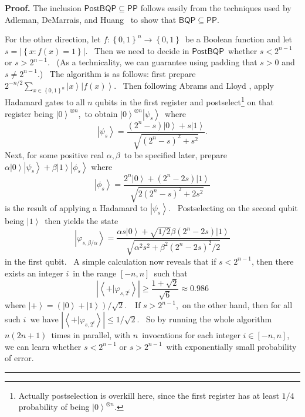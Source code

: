 \documentclass[12pt]{article}%
\newenvironment{proof}[1][Proof]{\noindent\textbf{#1.} }{\ \rule{0.5em}{0.5em}}
\begin{document}
\begin{proof}
The inclusion $\mathsf{PostBQP}\subseteq\mathsf{PP}$ follows easily from the
techniques used by Adleman, DeMarrais, and Huang \cite{adh}\ to show that
$\mathsf{BQP}\subseteq\mathsf{PP}$.

For the other direction, let $f:\left\{  0,1\right\}  ^{n}\rightarrow\left\{
0,1\right\}  $\ be a Boolean function and let $s=\left\vert \left\{
x:f\left(  x\right)  =1\right\}  \right\vert $. \ Then we need to decide in
$\mathsf{PostBQP}$\ whether $s<2^{n-1}$ or $s>2^{n-1}$. \ (As a technicality,
we can guarantee using padding that $s>0$ and $s\neq2^{n-1}$.) \ The algorithm
is as follows: first prepare $2^{-n/2}\sum_{x\in\left\{  0,1\right\}  ^{n}%
}\left\vert x\right\rangle \left\vert f\left(  x\right)  \right\rangle $.
\ Then following Abrams and Lloyd \cite{al}, apply Hadamard gates to all $n$
qubits in the first register and postselect\footnote{Actually postselection is
overkill here, since the first register has at least $1/4$ probability of
being $\left\vert 0\right\rangle ^{\otimes n}$.} on that register being
$\left\vert 0\right\rangle ^{\otimes n}$,\ to obtain $\left\vert
0\right\rangle ^{\otimes n}\left\vert \psi_{s}\right\rangle $\ where%
\[
\left\vert \psi_{s}\right\rangle =\frac{\left(  2^{n}-s\right)  \left\vert
0\right\rangle +s\left\vert 1\right\rangle }{\sqrt{\left(  2^{n}-s\right)
^{2}+s^{2}}}.
\]
Next, for some positive real $\alpha,\beta$\ to be specified later, prepare
$\alpha\left\vert 0\right\rangle \left\vert \psi_{s}\right\rangle
+\beta\left\vert 1\right\rangle \left\vert \phi_{s}\right\rangle $ where
\[
\left\vert \phi_{s}\right\rangle =\frac{2^{n}\left\vert 0\right\rangle
+\left(  2^{n}-2s\right)  \left\vert 1\right\rangle }{\sqrt{2\left(
2^{n}-s\right)  ^{2}+2s^{2}}}%
\]
is the result of applying a Hadamard to $\left\vert \psi_{s}\right\rangle $.
\ Postselecting on the second qubit being $\left\vert 1\right\rangle $\ then
yields the state%
\[
\left\vert \varphi_{s,\beta/\alpha}\right\rangle =\frac{\alpha s\left\vert
0\right\rangle +\sqrt{1/2}\beta\left(  2^{n}-2s\right)  \left\vert
1\right\rangle }{\sqrt{\alpha^{2}s^{2}+\beta^{2}\left(  2^{n}-2s\right)
^{2}/2}}%
\]
in the first qubit. \ A simple calculation now reveals that if $s<2^{n-1}$,
then there exists an integer $i$\ in the range $\left[  -n,n\right]  $\ such
that%
\[
\left\vert \left\langle +|\varphi_{s,2^{i}}\right\rangle \right\vert
\geq\frac{1+\sqrt{2}}{\sqrt{6}}\approx0.986
\]
where $\left\vert +\right\rangle =\left(  \left\vert 0\right\rangle
+\left\vert 1\right\rangle \right)  /\sqrt{2}$.\ \ If $s>2^{n-1}$,\ on the
other hand, then for all such $i$\ we have $\left\vert \left\langle
+|\varphi_{s,2^{i}}\right\rangle \right\vert \leq1/\sqrt{2}$. \ So by running
the whole algorithm $n\left(  2n+1\right)  $\ times in parallel, with
$n$\ invocations for each integer $i\in\left[  -n,n\right]  $, we can learn
whether $s<2^{n-1}$ or $s>2^{n-1}$\ with exponentially small probability of error.
\end{proof}
\end{document}
